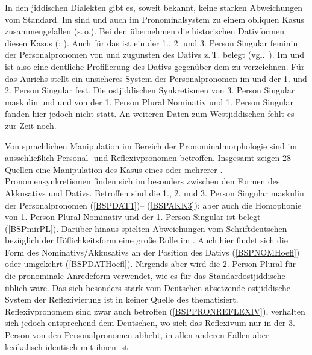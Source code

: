    
   In den jiddischen Dialekten gibt es, soweit bekannt, keine starken Abweichungen vom Standard. Im \hai{{\NOJ}} sind  und  auch im Pronominalsystem zu einem obliquen Kasus zusammengefallen (s.\,o.). Bei den  übernehmen die historischen Dativformen diesen Kasus (\citealt[184]{Jacobs2005}; \citealt[139–149]{Wolf1969}). Auch für das  ist ein  der 1., 2. und 3. Person  Singular feminin der Personalpronomen von  und  zugunsten des Dativs z.\,T. belegt (vgl.\, \citealt[139–149]{Wolf1969}). Im \hai{{\NOJ}} und  ist also eine deutliche Profilierung des Dativs gegenüber dem  zu verzeichnen. Für das \hai{{\NWJ}} Aurichs stellt \cite[63]{Reershemius2007} ein unsicheres System der Personalpronomen im  und  der 1. und 2. Person Singular fest. Die ostjiddischen Synkretismen von 3. Person Singular maskulin  und  und von der 1. Person Plural Nominativ und 1. Person Singular  fanden hier jedoch nicht statt.  An weiteren Daten zum Westjiddischen fehlt es zur Zeit noch. 


Von sprachlichen Manipulation im Bereich der Pronominalmorphologie sind im \hai{{\LiJi}} ausschließlich Personal- und Reflexivpronomen betroffen. Insgesamt  zeigen 28 Quellen eine Manipulation des Kasus eines oder mehrerer . Pronomensynkretismen finden sich im \hai{{\LiJi}} besonders zwischen den Formen des Akkusativs und Dativs. Betroffen sind die 1., 2. und 3. Person  Singular maskulin der Personalpronomen (\ref{BSPDAT1})– (\ref{BSPAKK3}); aber auch die Homophonie von 1.  Person Plural Nominativ und  der 1. Person Singular  ist belegt (\ref{BSPmirPL}). Darüber hinaus spielten Abweichungen vom Schriftdeutschen bezüglich der Höflichkeitsform eine große Rolle im \hai{{\LiJi}}. Auch hier findet sich die Form des Nominativs/Akkusativs an der Position des Dativs (\ref{BSPNOMHoefl}) oder umgekehrt (\ref{BSPDATHoefl}). Nirgends aber wird die 2. Person Plural für die pronominale Anredeform verwendet, wie es für das Standard\-ostjiddische üblich wäre. Das sich besonders stark vom Deutschen absetzende ostjiddische System der Reflexivierung ist in keiner Quelle des \hai{{\LiJieins}} thematisiert. Reflexivpronomem sind zwar auch betroffen (\ref{BSPPRONREFLEXIV}), verhalten sich jedoch entsprechend dem Deutschen, wo sich das Reflexivum nur in der 3. Person von den Personalpronomen abhebt, in allen anderen Fällen aber lexikalisch identisch mit ihnen ist. 
 

